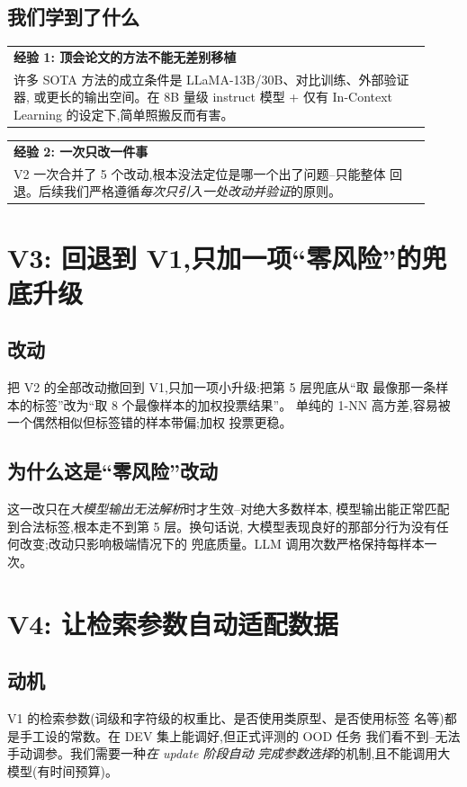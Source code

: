 \documentclass[10pt,twocolumn,letterpaper]{article}
\makeatletter
\newcommand{\insightbox}[2][\textbf{核心观察}]{%
  \par\medskip\noindent
  \begin{tabular}{@{}|@{\hspace{4pt}}p{0.92\linewidth}@{\hspace{4pt}}|@{}}
  \hline
  \rule{0pt}{2.6ex}\textbf{\color{insightclr}#1}\\[2pt]
  \small #2 \\[2pt]
  \hline
  \end{tabular}
  \par\medskip
}
\makeatother
\begin{document}
\subsection{我们学到了什么}

\insightbox[\textbf{经验 1: 顶会论文的方法不能无差别移植}]{%
许多 SOTA 方法的成立条件是 LLaMA-13B/30B、对比训练、外部验证器,
或更长的输出空间。在 8B 量级 instruct 模型 + 仅有 In-Context
Learning 的设定下,简单照搬反而有害。
}

\insightbox[\textbf{经验 2: 一次只改一件事}]{%
V2 一次合并了 5 个改动,根本没法定位是哪一个出了问题--只能整体
回退。后续我们严格遵循\emph{每次只引入一处改动并验证}的原则。
}

\section{V3: 回退到 V1,只加一项``零风险''的兜底升级}
\label{sec:v3}

\subsection{改动}
把 V2 的全部改动撤回到 V1,只加一项小升级:把第 5 层兜底从``取
最像那一条样本的标签''改为``取 8 个最像样本的加权投票结果''。
单纯的 1-NN 高方差,容易被一个偶然相似但标签错的样本带偏;加权
投票更稳。

\subsection{为什么这是``零风险''改动}
这一改只在\emph{大模型输出无法解析}时才生效--对绝大多数样本,
模型输出能正常匹配到合法标签,根本走不到第 5 层。换句话说,
大模型表现良好的那部分行为没有任何改变;改动只影响极端情况下的
兜底质量。LLM 调用次数严格保持每样本一次。


\section{V4: 让检索参数自动适配数据}
\label{sec:v4}

\subsection{动机}
V1 的检索参数(词级和字符级的权重比、是否使用类原型、是否使用标签
名等)都是手工设的常数。在 DEV 集上能调好,但正式评测的 OOD 任务
我们看不到--无法手动调参。我们需要一种\emph{在 update 阶段自动
完成参数选择}的机制,且不能调用大模型(有时间预算)。
\end{document}

